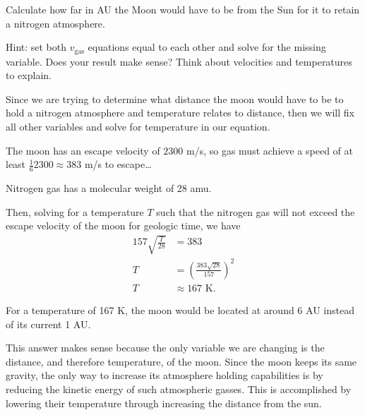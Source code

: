 \documentclass[../astro_4]{subfiles}
\begin{document}
\begin{problem}
Calculate how far in AU the Moon would have to be from the Sun for it to retain a nitrogen atmosphere.

Hint: set both $v_{\text{gas}}$ equations equal to each other and solve for the missing variable.
Does your result make sense?
Think about velocities and temperatures to explain.
\end{problem}
Since we are trying to determine what distance the moon would have to be to hold a nitrogen atmosphere and temperature relates to distance, then we will fix all other variables and solve for temperature in our equation.

The moon has an escape velocity of $2300$ m/s, so gas must achieve a speed of at least  $\frac{1}{6}2300\approx 383$ m/s to escape\dots

Nitrogen gas has a molecular weight of 28 amu.

Then, solving for a temperature $T$ such that the nitrogen gas will not exceed the escape velocity of the moon for geologic time, we have
\begin{align*}
	157\sqrt{\frac{T}{28}} & = 383                                          \\
	T                      & = {\left( \frac{383\sqrt{28}}{157} \right) }^2 \\
	T                      & \approx 167 \text{ K}
	.\end{align*}

For a temperature of 167 K, the moon would be located at around 6 AU instead of its current 1 AU.

This answer makes sense because the only variable we are changing is the distance, and therefore temperature, of the moon.
Since the moon keeps its same gravity, the only way to increase its atmosphere holding capabilities is by reducing the kinetic energy of such atmospheric gasses.
This is accomplished by lowering their temperature through increasing the distance from the sun.
\end{document}
